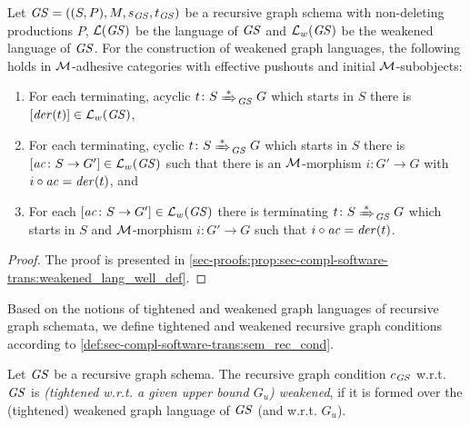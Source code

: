 \begin{proposition}
\label{prop:sec-compl-software-trans:weakened_lang_well_def}
Let $\mathit{GS}=((S,P),M,s_\mathit{GS},t_\mathit{GS})$ be a recursive graph schema with non-deleting productions $P$, $\mathcal{L}(\mathit{GS})$ be the language of $\mathit{GS}$ and $\mathcal{L}_w(\mathit{GS})$ be the weakened language of $\mathit{GS}$.
For the construction of weakened graph languages, the following holds in ${\cal M}$-adhesive categories with effective pushouts and initial ${\cal M}$-subobjects:
\begin{enumerate}
\item \label{item:sec-compl-software-trans:well_def_con_w_lan:1}For each terminating, acyclic $t\colon S \Trans{*}_\GS G$ which starts in $S$ there is $[\mathit{der}(t)] \in \mathcal{L}_w(\mathit{GS})$,
\item \label{item:sec-compl-software-trans:well_def_con_w_lan:2}For each terminating, cyclic $t\colon S \Trans{*}_\GS G$ which starts in $S$ there is $[\mathit{ac}\colon S \to G'] \in \mathcal{L}_w(\mathit{GS})$ such that there is an ${\cal M}$-morphism $i\colon G' \to G$ with $i \circ \mathit{ac}=\mathit{der}(t)$, and
\item \label{item:sec-compl-software-trans:well_def_con_w_lan:3}For each $[\mathit{ac}\colon S \to G'] \in \mathcal{L}_w(\mathit{GS})$ there is terminating $t\colon S \Trans{*}_\GS G$ which starts in $S$ and ${\cal M}$-morphism $i\colon G' \to G$ such that $i \circ \mathit{ac}=\mathit{der}(t)$.\envEndMarker
\end{enumerate}
\end{proposition}

\begin{proof}
The proof is presented in \cref{sec-proofs:prop:sec-compl-software-trans:weakened_lang_well_def}.
\end{proof}

Based on the notions of tightened and weakened graph languages of recursive graph schemata, we define tightened and weakened recursive graph conditions according to \cref{def:sec-compl-software-trans:sem_rec_cond}.

\begin{definition}
\label{def:sec-dc-general-rec:t_w_g_constr}
Let $\mathit{GS}$ be a recursive graph schema.
The recursive graph condition $c_\mathit{GS}$ w.r.t. $\mathit{GS}$ is \emph{(tightened w.r.t. a given upper bound $G_u$) weakened}, if it is formed over the (tightened) weakened graph language of $\mathit{GS}$ (and w.r.t. $G_u$).
\envEndMarker
\end{definition}

